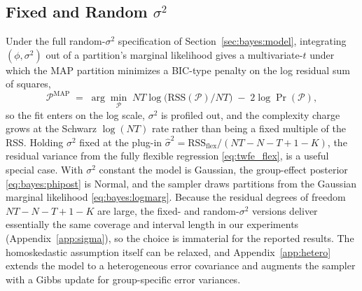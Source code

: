 \documentclass[margin=5in, 12pt]{article}
\newcommand{\1}{\mathbbm{1}}
\begin{document}
  \subsection{Fixed and Random $\sigma^{2}$}\label{sec:bayes:sigmafixed}

  Under the full random-$\sigma^{2}$ specification of Section~\ref{sec:bayes:model}, integrating $(\phi,\sigma^{2})$ out of a partition's marginal likelihood gives a multivariate-$t$ under which the MAP partition minimizes a BIC-type penalty on the log residual sum of squares,
  \begin{equation}
    \mathcal{P}^{\mathrm{MAP}} \;=\; \arg\min_{\mathcal{P}}\; NT\log\!\bigl(\mathrm{RSS}(\mathcal{P})/NT\bigr) \;-\; 2\log\Pr(\mathcal{P}),
    \label{eq:bic}
  \end{equation}
  so the fit enters on the log scale, $\sigma^{2}$ is profiled out, and the complexity charge grows at the Schwarz $\log(NT)$ rate rather than being a fixed multiple of the RSS. Holding $\sigma^{2}$ fixed at the plug-in $\hat\sigma^{2} = \mathrm{RSS}_{\text{flex}}/(NT - N - T + 1 - K)$, the residual variance from the fully flexible regression \eqref{eq:twfe_flex}, is a useful special case. With $\sigma^{2}$ constant the model is Gaussian, the group-effect posterior \eqref{eq:bayes:phipost} is Normal, and the sampler draws partitions from the Gaussian marginal likelihood \eqref{eq:bayes:logmarg}. Because the residual degrees of freedom $NT - N - T + 1 - K$ are large, the fixed- and random-$\sigma^{2}$ versions deliver essentially the same coverage and interval length in our experiments (Appendix~\ref{app:sigma}), so the choice is immaterial for the reported results. The homoskedastic assumption itself can be relaxed, and Appendix~\ref{app:hetero} extends the model to a heterogeneous error covariance and augments the sampler with a Gibbs update for group-specific error variances.
\end{document}
